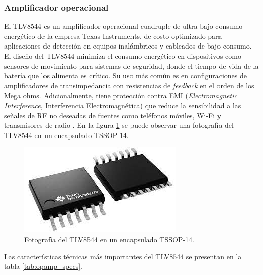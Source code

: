 \subsubsection{Amplificador operacional}
El TLV8544 es un amplificador operacional cuadruple de ultra bajo consumo energético de la empresa Texas Instruments, de costo optimizado para aplicaciones de detección en equipos inalámbricos y cableados de bajo consumo. El diseño del TLV8544 minimiza el consumo energético en dispositivos como sensores de movimiento para sistemas de seguridad, donde el tiempo de vida de la batería que los alimenta es crítico. Su uso más común es en configuraciones de amplificadores de transimpedancia con resistencias de \textit{feedback} en el orden de los Mega ohms. Adicionalmente, tiene protección contra EMI (\textit{Electromagnetic Interference}, Interferencia Electromagnética) que reduce la sensibilidad a las señales de RF no deseadas de fuentes como teléfonos móviles, Wi-Fi y transmisores de radio \cite{opamp_info}. En la figura \ref{fig:opamp_photo} se puede observar una fotografía del TLV8544 en un encapsulado TSSOP-14.

\vspace*{50 px}

\begin{figure}[h]
	\centering
	\includegraphics[scale=0.4]{./Figures/opamp_photo.jpeg}
	\caption{Fotografía del TLV8544 en un encapsulado TSSOP-14\protect\footnotemark.}
	\label{fig:opamp_photo}
\end{figure}

Las características técnicas más importantes del TLV8544 se presentan en la tabla \ref{tab:opamp_specs}.

